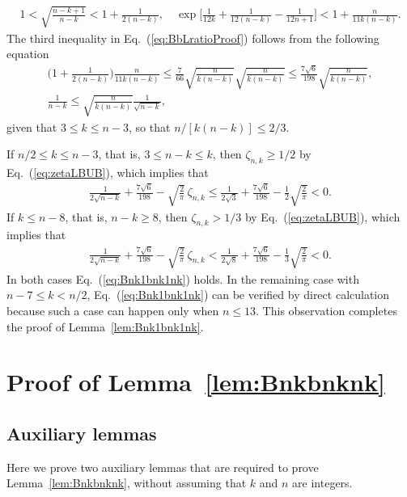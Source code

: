 \documentclass[aop]{imsart}
\theoremstyle{plain}
\theoremstyle{remark}
\newcommand{\1}{\operatorname{\uppercase\expandafter{\romannumeral1}}}
\newcommand{\2}{\operatorname{\uppercase\expandafter{\romannumeral2}}}
\newcommand{\3}{\operatorname{\uppercase\expandafter{\romannumeral3}}}
\newcommand{\4}{\operatorname{\uppercase\expandafter{\romannumeral4}}}
\newcommand{\5}{\operatorname{\uppercase\expandafter{\romannumeral5}}}
\newcommand{\6}{\operatorname{\uppercase\expandafter{\romannumeral6}}}
\newcommand{\7}{\operatorname{\uppercase\expandafter{\romannumeral7}}}
\newcommand{\8}{\operatorname{\uppercase\expandafter{\romannumeral8}}}
\newcommand{\9}{\operatorname{\uppercase\expandafter{\romannumeral9}}}
\newcommand{\eref}[1]{Eq.~\textup{(\ref{#1})}}
\newcommand{\lref}[1]{Lemma~\ref{#1}}
\begin{document}
\begin{appendix}
\begin{gather}
1<\sqrt{\frac{n-k+1}{n-k}}<1+\frac{1}{2(n-k)},\quad \exp\biggl[\frac{1}{12 k}+\frac{1}{12(n-k)}-\frac{1}{12n+1}\biggr]< 1+\frac{n}{11k(n-k)}. 
\end{gather}
The third inequality in \eref{eq:BbLratioProof} follows from the following equation
\begin{equation}
\begin{gathered}
\biggl(1+\frac{1}{2(n-k)}\biggr)\frac{n}{11k(n-k)}\leq \frac{7}{66}\sqrt{\frac{n}{k(n-k)}}\sqrt{\frac{n}{k(n-k)}}\leq 	\frac{7\sqrt{6}}{198} \sqrt{\frac{n}{k(n-k)}},\\
\frac{1}{n-k}\leq \sqrt{\frac{n}{k(n-k)}}\frac{1}{\sqrt{n-k}},
\end{gathered}
\end{equation}
given  that $3 \le k \le n-3$, so that $n/[k(n-k)]\leq 2/3$.

	
If $ n/2 \le k \le n-3$, that is, $3\leq n-k\leq k$, then  $\zeta_{n,k}\geq 1/2$ by \eref{eq:zetaLBUB}, which implies that
	\begin{align}
	\frac{1}{2\sqrt{n-k}}+
	\frac{7\sqrt{6}}{198}-\sqrt{\frac{2}{\pi}}\,
	\zeta_{n,k}\leq \frac{1}{2\sqrt{3}}+
	\frac{7\sqrt{6}}{198}-\frac{1}{2}\sqrt{\frac{2}{\pi}}<0. 
	\end{align} 
	If $k \le n-8$, that is, $n-k\geq 8$, then  $\zeta_{n,k}> 1/3$ by \eref{eq:zetaLBUB}, which implies that
	\begin{align}
	\frac{1}{2\sqrt{n-k}}+
	\frac{7\sqrt{6}}{198}-\sqrt{\frac{2}{\pi}}\,
	\zeta_{n,k}< \frac{1}{2\sqrt{8}}+
	\frac{7\sqrt{6}}{198}-\frac{1}{3}\sqrt{\frac{2}{\pi}}<0. 
	\end{align} 
	In both cases \eref{eq:Bnk1bnk1nk} holds. In the remaining case with 
	$n-7\le k < n/2$,
	\eref{eq:Bnk1bnk1nk} can be verified by direct calculation
	because such a case can happen only when $n \le 13$.
	 This observation completes the proof of \lref{lem:Bnk1bnk1nk}.





\section{\label{app:Bnjbnjk/n2}Proof of \lref{lem:Bnkbnknk}}
\subsection{Auxiliary lemmas}
Here we prove two auxiliary lemmas that are required to prove \lref{lem:Bnkbnknk}, without  assuming that $k$ and $n$ are integers. 


\end{appendix}
\end{document}
